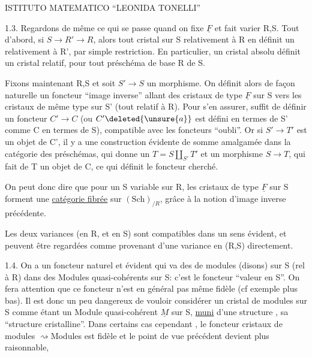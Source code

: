 
ISTITUTO MATEMATICO ``LEONIDA TONELLI''




1.3. Regardons de même ce qui se passe quand on fixe $\underline F$ et fait varier R,S. Tout d'abord, si $S\to R'\to R$, alors tout cristal sur S relativement à R en définit un  relativement à R', par simple restriction. En particulier, un cristal absolu définit un cristal relatif, pour tout préschéma de base R de S.

Fixons maintenant R,S et soit $S'\to S$ un morphisme. On définit alors de façon naturelle un foncteur ``image inverse'' allant des cristaux de type $\underline F$ sur S vers les cristaux de même type sur S' (tout relatif à R). Pour s'en assurer,  suffit de définir un foncteur $C'\longrightarrow C$ (ou $C'\deleted{\unsure{a}}$ est défini en termes de S' comme C en termes de S), compatible avec les foncteurs ``oubli''. Or si $S'\longrightarrow T'$ est un objet de C', il y a une construction évidente de somme amalgamée dans la catégorie des préschémas, qui donne un $T=S\amalg_{S'}T'$ et un morphisme $S\longrightarrow T$, qui fait de T un objet de C, ce qui définit le foncteur cherché.

On peut donc dire que pour un S variable sur R, les cristaux de type $\underline F$ sur S forment une \uline{catégorie fibrée} sur $(\mathrm{Sch})_{/R}$, grâce à la notion d'image inverse précédente.

Les deux variances (en R, et en S) sont compatibles dans un sens évident, et peuvent être regardées comme provenant d'une variance en (R,S) directement.

1.4. On a un foncteur naturel et évident qui va des  de modules (disons) sur S (rel à R) dans des Modules quasi-cohérents sur S: c'est le foncteur ``valeur en S''. On fera attention que ce foncteur n'est en général pas même fidèle (cf exemple  plus bas). Il est donc un peu dangereux de vouloir considérer un cristal de modules sur S comme étant un Module quasi-cohérent $\underline M$ sur S, \uline{muni} d'une structure , sa ``structure cristalline''. Dans certains cas cependant , le foncteur cristaux de modules $\rightsquigarrow$Modules est fidèle et le point de vue précédent devient plus raisonnable,

